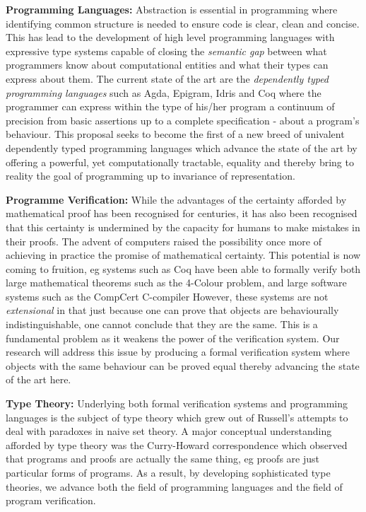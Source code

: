 \documentclass[a4paper,11pt]{article}
\begin{document}
{\bf Programming Languages:} Abstraction is essential in programming
where identifying common structure is needed to ensure code is clear,
clean and concise. This has lead to the development of high level
programming languages with expressive type systems capable of closing
the {\em semantic gap} between what programmers know about
computational entities and what their types can express about them.
The current state of the art are the {\em dependently typed
  programming languages} such as Agda, Epigram, Idris and Coq where
the programmer can express within the type of his/her program a
continuum of precision from basic assertions up to a complete
specification - about a program’s behaviour. This proposal seeks to
become the first of a new breed of univalent dependently typed
programming languages which advance the state of the art by offering a
powerful, yet computationally tractable, equality and thereby bring to
reality the goal of programming up to invariance of representation.


{\bf Programme Verification:} While the advantages of the certainty
afforded by mathematical proof has been recognised for centuries, it
has also been recognised that this certainty is undermined by the
capacity for humans to make mistakes in their proofs. The advent of
computers raised the possibility once more of achieving in practice
the promise of mathematical certainty. This potential is now coming to
fruition, eg systems such as Coq have been able to formally verify
both large mathematical theorems such as the 4-Colour problem, and
large software systems such as the CompCert C-compiler
However, these systems
are not {\em extensional} in that just because one can prove that
objects are behaviourally indistinguishable, one cannot conclude that
they are the same. This is a fundamental problem as it weakens the
power of the verification system. Our research will address this
issue by producing a formal verification system where objects with the
same behaviour can be proved equal thereby advancing the state of the
art here.


{\bf Type Theory:} Underlying both formal verification systems and
programming languages is the subject of type theory which grew out of
Russell's attempts to deal with paradoxes in naive set theory. A major
conceptual understanding afforded by type theory was the Curry-Howard
correspondence which observed that programs and proofs are actually
the same thing, eg proofs are just particular forms of programs. As a
result, by developing sophisticated type theories, we advance both the
field of programming languages and the field of program verification.
\end{document}
